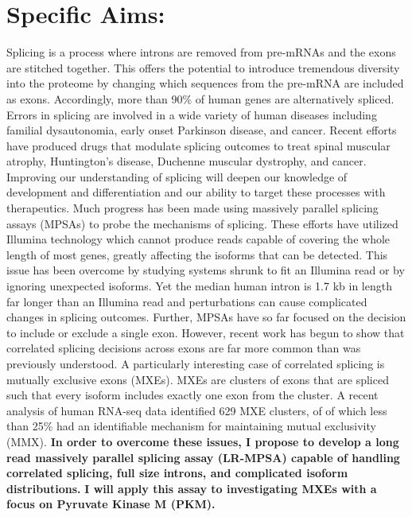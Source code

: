 \documentclass{article}
\begin{document}
\section*{Specific Aims:}
%
Splicing is a process where introns are removed from pre-mRNAs and the exons are stitched together. 
This offers the potential to introduce tremendous diversity into the proteome by changing which sequences from the pre-mRNA are included as exons.
Accordingly, more than 90\% of human genes are alternatively spliced.\supercite{Wang2008-ej} 
Errors in splicing are involved in a wide variety of human diseases including familial dysautonomia, early onset Parkinson disease, and cancer.\supercite{Scotti2015-yp} 
Recent efforts have produced drugs that modulate splicing outcomes to treat spinal muscular atrophy, Huntington's disease, Duchenne muscular dystrophy, and cancer.\supercite{Neil2022-vf}
Improving our understanding of splicing will deepen our knowledge of development and differentiation and our ability to target these processes with therapeutics.
Much progress has been made using massively parallel splicing assays (MPSAs) to probe the mechanisms of splicing.\supercite{Ke2018-af, Julien2016-wa, Adamson2018-va, Soemedi2017-pz, Cortes-Lopez2022-gy, Schirman2021-ss, Mikl2019-ng, Braun2018-mb, Soucek2019-iq, Baeza-Centurion2020-tn, Cheung2019-ah, Baeza-Centurion2019-hz, Rosenberg2015-zs, Wong2018-vq} 
These efforts have utilized Illumina technology which cannot produce reads capable of covering the whole length of most genes, greatly affecting the isoforms that can be detected.
This issue has been overcome by studying systems shrunk to fit an Illumina read or by ignoring unexpected isoforms.
Yet the median human intron is 1.7 kb in length\supercite{Piovesan2019-rp} far longer than an Illumina read and perturbations can cause complicated changes in splicing outcomes.\supercite{Cortes-Lopez2022-gy,Wang2012-dr,Mathur2019-hy}
Further, MPSAs have so far focused on the decision to include or exclude a single exon.
However, recent work has begun to show that correlated splicing decisions across exons are far more common than was previously understood.\supercite{Zhu2021-fs, Tilgner2015-sb, Hatje2017-oj,Tilgner2018-jo} 
A particularly interesting case of correlated splicing is mutually exclusive exons (MXEs). 
MXEs are clusters of exons that are spliced such that every isoform includes exactly one exon from the cluster. 
A recent analysis of human RNA-seq data identified 629 MXE clusters, of of which less than 25\% had an identifiable mechanism for maintaining mutual exclusivity (MMX).\supercite{Hatje2017-oj} 
\textbf{In order to overcome these issues, I propose to develop a long read massively parallel splicing assay (LR-MPSA) capable of handling correlated splicing, full size introns, and complicated isoform distributions.} 
\textbf{I will apply this assay to investigating MXEs with a focus on Pyruvate Kinase M (PKM).} 
\\
\end{document}
